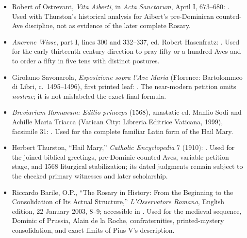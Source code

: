 \begin{itemize}
  \item Robert of Ostrevant, \emph{Vita Aiberti}, in \emph{Acta Sanctorum}, April I, 673--680: . Used with Thurston's historical analysis for Aibert's pre-Dominican counted-Ave discipline, not as evidence of the later complete Rosary.
  \item \emph{Ancrene Wisse}, part I, lines 300 and 332--337, ed. Robert Hasenfratz: . Used for the early-thirteenth-century direction to pray fifty or a hundred Aves and to order a fifty in five tens with distinct postures.
  \item Girolamo Savonarola, \emph{Esposizione sopra l'Ave Maria} (Florence: Bartolommeo di Libri, c.~1495--1496), first printed leaf: . The near-modern petition omits \emph{nostrae}; it is not mislabeled the exact final formula.
  \item \emph{Breviarium Romanum: Editio princeps} (1568), anastatic ed. Manlio Sodi and Achille Maria Triacca (Vatican City: Libreria Editrice Vaticana, 1999), facsimile 31: . Used for the complete familiar Latin form of the Hail Mary.
  \item Herbert Thurston, ``Hail Mary,'' \emph{Catholic Encyclopedia} 7 (1910): . Used for the joined biblical greetings, pre-Dominic counted Aves, variable petition stage, and 1568 liturgical stabilization; its dated judgments remain subject to the checked primary witnesses and later scholarship.
  \item Riccardo Barile, O.P., ``The Rosary in History: From the Beginning to the Consolidation of Its Actual Structure,'' \emph{L'Osservatore Romano}, English edition, 22 January 2003, 8--9; accessible in . Used for the medieval sequence, Dominic of Prussia, Alain de la Roche, confraternities, printed-mystery consolidation, and exact limits of Pius V's description.

\end{itemize}
